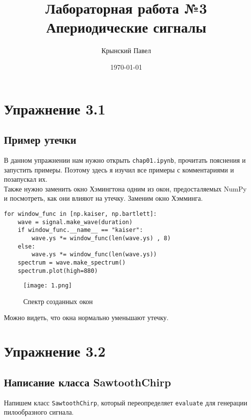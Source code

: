 \documentclass[a4paper,12pt]{report}
\title{Лабораторная работа №3\\Апериодические сигналы}
\author{Крынский Павел}
\date{\today}
\begin{document}
\maketitle
\tableofcontents
\listoffigures
\lstlistoflistings

\maketitle

\chapter{Упражнение 3.1}
\section{Пример утечки}

В данном упражнении нам нужно открыть \texttt{chap01.ipynb}, прочитать пояснения и  запустить примеры. Поэтому здесь я изучил все примеры с комментариями и позапускал их. \\ Также нужно заменить окно Хэмингтона одним из окон, предосталяемых NumPy и посмотреть, как они влияют на утечку. Заменим окно Хэмминга.

\begin{lstlisting}[caption=Создание других окон]
for window_func in [np.kaiser, np.bartlett]:
    wave = signal.make_wave(duration)
    if window_func.__name__ == "kaiser":
        wave.ys *= window_func(len(wave.ys) , 8)
    else:
        wave.ys *= window_func(len(wave.ys))
    spectrum = wave.make_spectrum()
    spectrum.plot(high=880)
\end{lstlisting}

\begin{figure}[H]
        \centering
        \texttt{[image: 1.png]}
        \caption{Спектр созданных окон}
        \label{fig:lab3_fig1}
\end{figure}

Можно видеть, что окна нормально уменьшают утечку.

\chapter{Упражнение 3.2}
\section{Написание класса SawtoothChirp}

Напишем класс \texttt{SawtoothChirp}, который переопределяет \texttt{evaluate} для генерации пилообразного сигнала.
\end{document}
